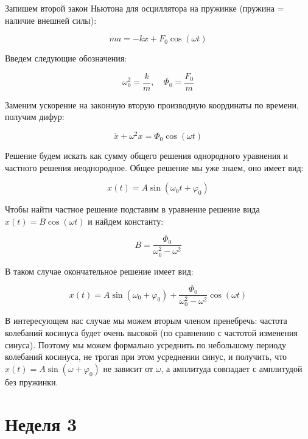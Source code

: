 \documentclass[a4paper, 12pt]{article}
\renewcommand{\phi}{\varphi} %
\begin{document}
Запишем второй закон Ньютона для осциллятора на пружинке (пружина = наличие внешней силы):

\begin{equation}
	ma = -kx + F_0\cos(\omega t)
\end{equation}

Введем следующие обозначения:

\begin{equation}
	\omega_0^2 = \frac{k}{m}, \quad \Phi_0 = \frac{F_0}{m}
\end{equation}

Заменим ускорение на законную вторую производную координаты по времени, получим дифур:

\begin{equation}
	\ddot{x} + \omega^2 x = \Phi_0 \cos(\omega t)
\end{equation}

Решение будем искать как сумму общего решения однородного уравнения и частного решения неоднородное. Общее решение мы уже знаем, оно имеет вид:

\begin{equation}
	x(t) = A \sin(\omega_0 t + \phi_0)
\end{equation}

Чтобы найти частное решение подставим в уравнение решение вида $x(t) = B \cos(\omega t)$ и найдем константу:

\begin{equation}
	B = \frac{\Phi_0}{\omega_0^2 - \omega^2}
\end{equation}

В таком случае окончательное решение имеет вид:

\begin{equation}
	x(t) = A\sin(\omega_0 + \phi_0) + \frac{\Phi_0}{\omega_0^2 - \omega^2} \cos(\omega t)
\end{equation}

В интересующем нас случае мы можем вторым членом пренебречь: частота колебаний косинуса будет очень высокой (по сравнению с частотой изменения синуса). Поэтому мы можем формально усреднить по небольшому периоду колебаний косинуса, не трогая при этом усреднении синус, и получить, что $x(t) = A\sin(\omega + \phi_0)$ не зависит от $\omega$, а амплитуда совпадает с амплитудой без пружинки.

\newpage

\section{Неделя 3}
\end{document}
